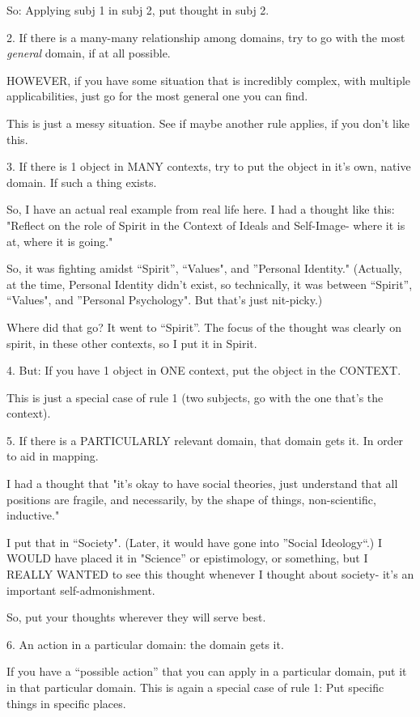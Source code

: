 \documentclass[oneside]{book}
\begin{document}
So: Applying subj 1 in subj 2, put thought in subj 2.

2. If there is a many-many relationship among domains, try to go with
   the most \emph{general} domain, if at all possible.

HOWEVER, if you have some situation that is incredibly complex, with
multiple applicabilities, just go for the most general one you can
find.

This is just a messy situation. See if maybe another rule applies, if
you don't like this.

3. If there is 1 object in MANY contexts, try to put the object in
   it's own, native domain. If such a thing exists.

So, I have an actual real example from real life here.
I had a thought like this: "Reflect on the role of Spirit in the
Context of Ideals and Self-Image- where it is at, where it is going."

So, it was fighting amidst ``Spirit'', ``Values", and ''Personal
Identity." (Actually, at the time, Personal Identity didn't exist, so
technically, it was between ``Spirit'', ``Values", and ''Personal
Psychology". But that's just nit-picky.)

Where did that go? It went to ``Spirit''. The focus of the thought was
clearly on spirit, in these other contexts, so I put it in Spirit.

4. But: If you have 1 object in ONE context, put the object in the
   CONTEXT.

This is just a special case of rule 1 (two subjects, go with the one
that's the context).

5. If there is a PARTICULARLY relevant domain, that domain gets it.
   In order to aid in mapping.

I had a thought that "it's okay to have social theories, just
understand that all positions are fragile, and necessarily, by the
shape of things, non-scientific, inductive."

I put that in ``Society". (Later, it would have gone into ''Social
Ideology``.) I WOULD have placed it in "Science'' or epistimology, or
something, but I REALLY WANTED to see this thought whenever I thought
about society- it's an important self-admonishment.

So, put your thoughts wherever they will serve best.

6. An action in a particular domain: the domain gets it.

If you have a ``possible action'' that you can apply in a particular
domain, put it in that particular domain. This is again a special case
of rule 1: Put specific things in specific places.
\end{document}

